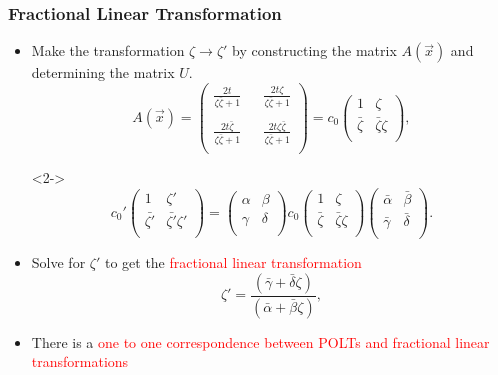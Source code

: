 \documentclass[10pt,a4paper]{beamer}
\begin{document}
\begin{frame}
\frametitle{Fractional Linear Transformation}
\begin{itemize}
\item<1->{Make the transformation $\zeta \rightarrow \zeta'$ by constructing the matrix $A(\vec{x})$ and determining the matrix $U$.
\begin{equation*}
A(\vec{x}) = 
\left(
\begin{array}{ccc}
\frac{2t}{\zeta\bar{\zeta}+1} & & \frac{2t\zeta}{\zeta\bar{\zeta}+1} \\
 & & \\
\frac{2t\bar{\zeta}}{\zeta\bar{\zeta}+1} & & \frac{2t\zeta\bar{\zeta}}{\zeta\bar{\zeta}+1} \\
\end{array}
\right)
=
c_0\left(
\begin{array}{cc}
1           & \zeta \\ 
\bar{\zeta} & \bar{\zeta}\zeta \\ 
\end{array}
\right),
\end{equation*}
}
\item[]<2->{
\begin{equation*}
{c_0}'\left(
\begin{array}{cc}
1           & \zeta' \\ 
\bar{\zeta'} & \bar{\zeta'}\zeta' \\ 
\end{array}
\right)
=
\left(
\begin{array}{cc}
\alpha & \beta \\
\gamma & \delta \\
\end{array}
\right)
{c_0}\left(
\begin{array}{cc}
1           & \zeta \\ 
\bar{\zeta} & \bar{\zeta}\zeta \\ 
\end{array}
\right)
\left(
\begin{array}{cc}
\bar{\alpha} & \bar{\beta} \\
\bar{\gamma} & \bar{\delta} \\
\end{array}
\right).
\end{equation*}
}
\item<3->{Solve for $\zeta'$ to get the \textcolor{red}{fractional linear transformation}
\begin{equation*}
\zeta' = \frac{(\bar{\gamma} + \bar{\delta}\zeta)}{(\bar{\alpha} + \bar{\beta}\zeta)},
\end{equation*}
}
\item<4->{There is a \textcolor{red}{one to one correspondence between POLTs and fractional linear transformations}}
\end{itemize}


\end{frame}
\end{document}
